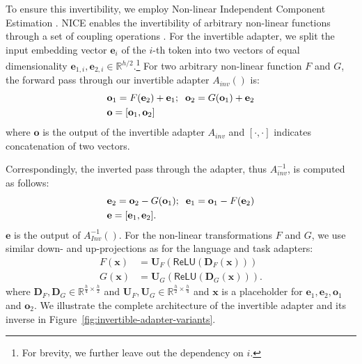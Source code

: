 \documentclass[11pt,a4paper]{article}
\begin{document}
To ensure this invertibility, we employ Non-linear Independent Component Estimation \cite[NICE;][]{Dinh2014NICE}. NICE enables the invertibility of arbitrary non-linear functions through a set of coupling operations \cite{Dinh2014NICE}.
For the invertible adapter, we split the input embedding vector $\textbf{e}_i$ of the $i$-th token into two vectors of equal dimensionality $\textbf{e}_{1,i}, \textbf{e}_{2,i} \in \mathbb{R}^{h/2}$.\footnote{For brevity, we further leave out the dependency on $i$.} For two arbitrary non-linear function $F$ and $G$, the forward pass through our invertible adapter $A_{inv}()$ is:
\begin{equation}
\begin{split}
    &\textbf{o}_1  =F(\textbf{e}_2) + \textbf{e}_1;\hspace{2mm} \textbf{o}_2 =  G(\textbf{o}_1) + \textbf{e}_2 \\
    &\textbf{o} = [\textbf{o}_1 , \textbf{o}_2]
\end{split}
\end{equation}
where $\textbf{o}$ is the output of the invertible adapter $A_{inv}$ and $[\cdot,\cdot]$ indicates concatenation of two vectors. 

Correspondingly, the inverted pass through the adapter, thus $A_{inv}^{-1}$, is computed as follows:
\begin{equation}
\begin{split}
    & \textbf{e}_2 = \textbf{o}_2 - G(\textbf{o}_1);\hspace{2mm} \textbf{e}_1 = \textbf{o}_1 - F(\textbf{e}_2) \\
    & \textbf{e} = [\textbf{e}_1 , \textbf{e}_2].
\end{split}
\end{equation}
$\textbf{e}$ is the output of $A_{Inv}^{-1}()$. For the non-linear transformations $F$ and $G$, we use similar down- and up-projections as for the language and task adapters:
\vspace{-1mm}
\begin{equation}
\begin{split}
F(\textbf{x}) &  = \textbf{U}_F(\mathsf{ReLU}(\textbf{D}_F(\textbf{x})))  \\
G(\textbf{x}) & = \textbf{U}_G(\mathsf{ReLU}(\textbf{D}_G(\textbf{x}))).
\end{split}
\end{equation}
where $\textbf{D}_F, \textbf{D}_G \in \mathbb{R}^{\frac{h}{4} \times \frac{h}{2}}$ and  $\textbf{U}_F, \textbf{U}_G \in \mathbb{R}^{\frac{h}{2} \times \frac{h}{4}}$ and $\textbf{x}$ is a placeholder for $\textbf{e}_1, \textbf{e}_2, \textbf{o}_1$ and $\textbf{o}_2$. We illustrate the complete architecture of the invertible adapter and its inverse in Figure~\ref{fig:invertible-adapter-variants}. 
\end{document}
